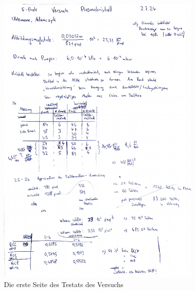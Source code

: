 \documentclass[12pt,a4paper,ngerman]{article}
\begin{document}
 \begin{figure}[ht]
 	\centering
 	\includegraphics[width=0.9\textwidth, page=1]{data/Testat_Plasmakristall.pdf}		
 	\caption[Testat 1]{Die erste Seite des Testats des Versuchs}
 	\label{fig:Testat}
 \end{figure}
\end{document}
